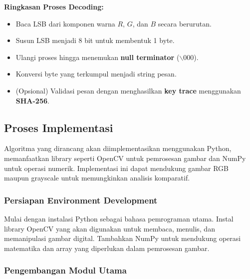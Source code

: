 \documentclass{ittelkom}
\begin{document}
\begin{enumerate}
\begin{enumerate}
          \end{enumerate}

          \noindent
          \textbf{Ringkasan Proses Decoding:}
          \begin{itemize}
              \item Baca LSB dari komponen warna $R$, $G$, dan $B$ secara berurutan.
              \item Susun LSB menjadi 8 bit untuk membentuk 1 byte.
              \item Ulangi proses hingga menemukan \textbf{null terminator} ($\backslash 000$).
              \item Konversi byte yang terkumpul menjadi string pesan.
              \item (Opsional) Validasi pesan dengan menghasilkan \textbf{key trace} menggunakan \textbf{SHA-256}.
          \end{itemize}
\end{enumerate}

\subsection{Proses Implementasi}

Algoritma yang dirancang akan diimplementasikan menggunakan Python,
memanfaatkan library seperti OpenCV untuk pemrosesan gambar dan NumPy untuk
operasi numerik. Implementasi ini dapat mendukung gambar RGB maupun grayscale
untuk memungkinkan analisis komparatif.

\subsubsection{Persiapan Environment Development}

Mulai dengan instalasi Python sebagai bahasa pemrograman utama. Instal library
OpenCV yang akan digunakan untuk membaca, menulis, dan memanipulasi gambar
digital. Tambahkan NumPy untuk mendukung operasi matematika dan array yang
diperlukan dalam pemrosesan gambar.

\subsubsection{Pengembangan Modul Utama}
\end{document}
